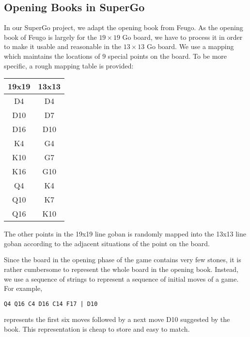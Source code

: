 \subsection{Opening Books in SuperGo}

In our SuperGo project, we adapt the opening book from Feugo. As the opening book of Feugo is largely for the $19 \times 19$ Go board, we have to process it in order to make it usable and reasonable in the $13 \times 13$ Go board. We use a mapping which maintains the locations of $9$ special points on the board. To be more specific, a rough mapping table is provided:

\begin{center}
\begin{tabular}{c|c}

19x19 & 13x13 \\ \hline
D4 & D4 \\
D10 & D7 \\
D16 & D10 \\
K4 & G4 \\
K10 & G7 \\
K16 & G10 \\
Q4 & K4 \\
Q10 & K7 \\
Q16 & K10 \\
\end{tabular}
\end{center}

The other points in the 19x19 line goban is randomly mapped into the 13x13 line goban according to the adjacent situations of the point on the board.

Since the board in the opening phase of the game contains very few stones, it is rather cumbersome to represent the whole board in the opening book. Instead, we use a sequence of strings to represent a sequence of initial moves of a game. For example,
\begin{verbatim}
Q4 Q16 C4 D16 C14 F17 | D10
\end{verbatim}
represents the first six moves followed by a next move D10 suggested by the book. This representation is cheap to store and easy to match.
